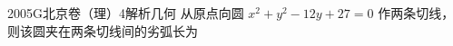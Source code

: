 
\begin{problem}{2005}{G}{北京卷（理）}{4}{解析几何}
从原点向圆 $ x^2+y^2-12y+27=0 $ 作两条切线，则该圆夹在两条切线间的劣弧长为
\begin{choices}
\choice{{ $\pi$ }}
\choice{{ $2\pi$ }}
\choice{{ $4\pi$ }}
\choice{{ $6\pi$ }}
\end{choices}
\end{problem}

\begin{answer}

\end{answer}

\begin{solutions}

\end{solutions}